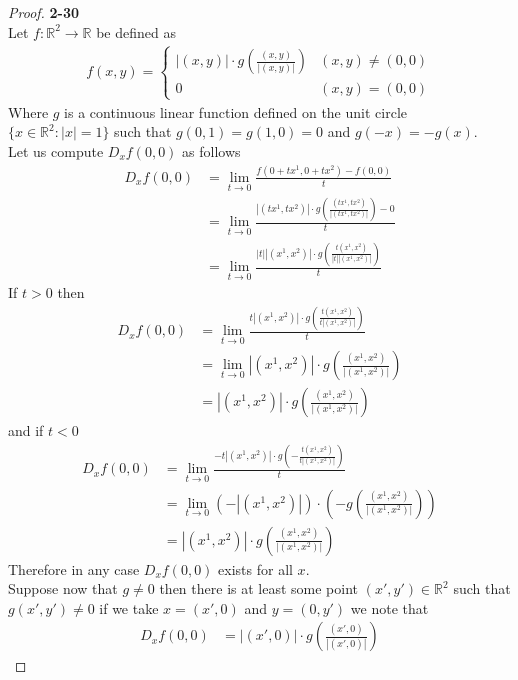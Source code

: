 \documentclass[11pt]{article}
\newcommand{\R}{\mathbb{R}}
\theoremstyle{definition}
\begin{document}
\cleardoublepage
\begin{proof}{\textbf{2-30}}\\
Let $f:\R^2\to\R$ be defined as
\begin{align*}
    f(x,y) = \begin{cases}
        |(x,y)| \cdot g\left(\frac{(x,y)}{|(x,y)|}\right) & (x,y) \neq (0,0)\\
        0 & (x,y) = (0,0)
    \end{cases}
\end{align*}
Where $g$ is a continuous linear function defined on the unit circle
$\{x\in \R^2:|x| = 1\}$ such that $g(0,1) = g(1,0) = 0$ and $g(-x) = -g(x)$.\\
Let us compute $D_x f(0,0)$ as follows
\begin{align*}
    D_x f(0,0) &= \lim_{t\to 0} \frac{f(0 + tx^1, 0 + tx^2) - f(0,0)}{t}\\
    &= \lim_{t\to 0} \frac{|(tx^1,tx^2)|
    \cdot g\left(\frac{(tx^1, tx^2)}{|(tx^1,tx^2)|}\right) - 0}{t}\\
    &= \lim_{t\to 0} \frac{|t||(x^1, x^2)|
    \cdot g\left(\frac{t(x^1, x^2)}{|t||(x^1,x^2)|}\right)}{t}
\end{align*}
If $t > 0$ then
\begin{align*}
    D_x f(0,0)
    &= \lim_{t\to 0} \frac{t|(x^1, x^2)|
    \cdot g\left(\frac{t(x^1, x^2)}{t|(x^1,x^2)|}\right)}{t}\\
    &= \lim_{t\to 0} |(x^1, x^2)|
    \cdot g\left(\frac{(x^1, x^2)}{|(x^1,x^2)|}\right)\\
    &= |(x^1, x^2)|\cdot g\left(\frac{(x^1, x^2)}{|(x^1,x^2)|}\right)
\end{align*}
and if $t < 0$
\begin{align*}
    D_x f(0,0)
    &= \lim_{t\to 0} \frac{-t|(x^1, x^2)|
    \cdot g\left(-\frac{t(x^1, x^2)}{t|(x^1,x^2)|}\right)}{t}\\
    &= \lim_{t\to 0} (-|(x^1, x^2)|)
    \cdot \left(-g\left(\frac{(x^1, x^2)}{|(x^1,x^2)|}\right)\right)\\
    &= |(x^1, x^2)|\cdot g\left(\frac{(x^1, x^2)}{|(x^1,x^2)|}\right)
\end{align*}
Therefore in any case $D_x f(0,0)$ exists for all $x$.\\
Suppose now that $g \neq 0$ then there is at least some point $(x', y') \in \R^2$
such that $g(x', y') \neq 0$ if we take $x = (x',0)$ and $y = (0,y')$ we
note that
\begin{align*}
    D_xf(0,0) &= |(x',0)|\cdot g\left(\frac{(x',0)}{|(x',0)|}\right)

\end{align*}
\end{proof}
\end{document}
